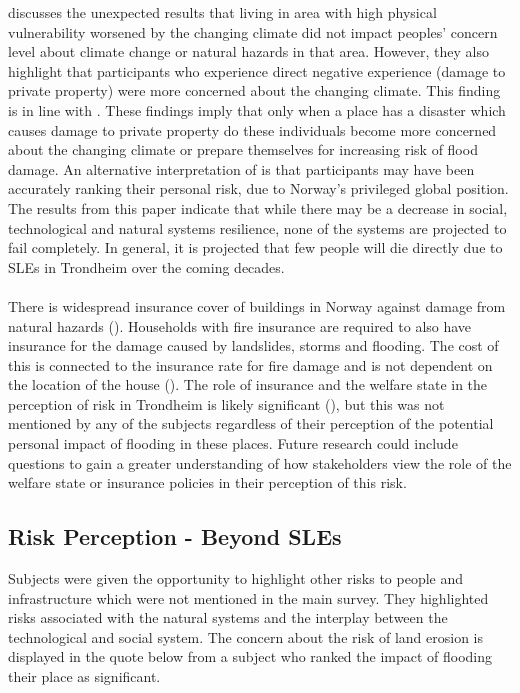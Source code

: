 \cite{lujala_climate_2015} discusses the unexpected results that living in area with high physical vulnerability worsened by the changing climate did not impact peoples' concern level about climate change or natural hazards in that area. However, they also highlight that participants who experience direct negative experience (damage to private property) were more concerned about the changing climate. This finding is in line with \cite{whitmarsh_are_2008}. These findings imply that only when a place has a disaster which causes damage to private property do these individuals become more concerned about the changing climate or prepare themselves for increasing risk of flood damage. An alternative interpretation of \cite{lujala_climate_2015} is that participants may have been accurately ranking their personal risk, due to Norway's privileged global position. The results from this paper indicate that while there may be a decrease in social, technological and natural systems resilience, none of the systems are projected to fail completely. In general, it is projected that few people will die directly due to SLEs in Trondheim over the coming decades.
\paragraph{}


There is widespread insurance cover of buildings in Norway against damage from natural hazards (\cite{lujala_role_2020}). Households with fire insurance are required to also have insurance for the damage caused by landslides, storms and flooding. The cost of this is connected to the insurance rate for fire damage and is not dependent on the location of the house (\cite{lujala_role_2020}). The role of insurance and the welfare state in the perception of risk in Trondheim is likely significant (\cite{lujala_role_2020}), but this was not mentioned by any of the subjects regardless of their perception of the potential personal impact of flooding in these places. Future research could include questions to gain a greater understanding of how stakeholders view the role of the welfare state or insurance policies in their perception of this risk. 

\subsection{Risk Perception - Beyond SLEs}
Subjects were given the opportunity to highlight other risks to people and infrastructure which were not mentioned in the main survey. They highlighted risks associated with the natural systems and the interplay between the technological and social system. The concern about the risk of land erosion is displayed in the quote below from a subject who ranked the impact of flooding their place as significant.

